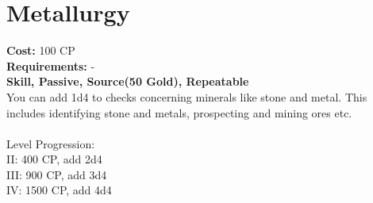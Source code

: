 \section{Metallurgy}
\textbf{Cost:} 100 CP\\
\textbf{Requirements:} -\\
\textbf{Skill, Passive, Source(50 Gold), Repeatable}\\
You can add 1d4 to checks concerning minerals like stone and metal. This includes identifying stone and metals, prospecting and mining ores etc.\\
\\
Level Progression:\\
II: 400 CP, add 2d4\\
III: 900 CP, add 3d4\\
IV: 1500 CP, add 4d4\\